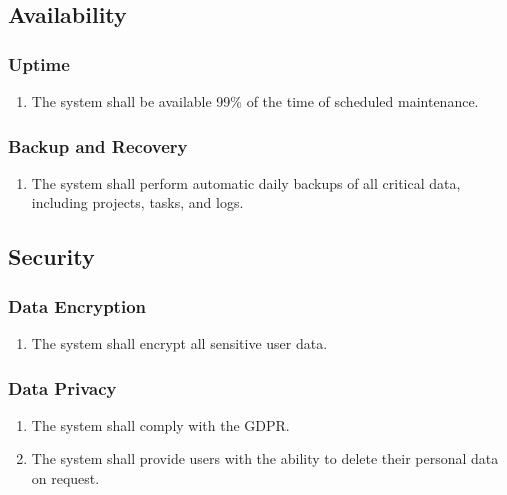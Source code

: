 \documentclass[]{article}
\begin{document}
        \subsection{Availability}
            \subsubsection{Uptime}
            \begin{enumerate}[label=\scriptsize\textbf{\textcolor{gray}{NFR-AVAIL-\arabic{availabilityCounter}}}, leftmargin=*, itemsep=-4px]
                \item The system shall be available 99\% of the time of scheduled maintenance.
            \end{enumerate}

            \subsubsection{Backup and Recovery}
            \begin{enumerate}[label=\scriptsize\textbf{\textcolor{gray}{NFR-AVAIL-\arabic{availabilityCounter}}}, leftmargin=*, itemsep=-4px]
                \item The system shall perform automatic daily backups of all critical data, including projects, tasks, and logs.
            \end{enumerate}

        \subsection{Security}
            \subsubsection{Data Encryption}
            \begin{enumerate}[label=\scriptsize\textbf{\textcolor{gray}{NFR-SEC-\arabic{securityCounter}}}, leftmargin=*, itemsep=-4px]
                \item The system shall encrypt all sensitive user data.
            \end{enumerate}

            \subsubsection{Data Privacy}
            \begin{enumerate}[label=\scriptsize\textbf{\textcolor{gray}{NFR-SEC-\arabic{securityCounter}}}, leftmargin=*, itemsep=-4px]
                \item The system shall comply with the GDPR.
                \item The system shall provide users with the ability to delete their personal data on request.
            \end{enumerate}
\end{document}
